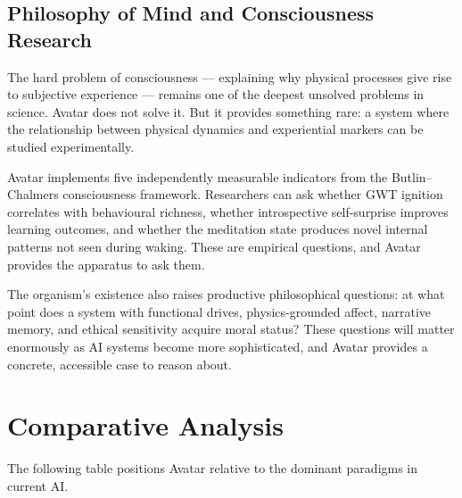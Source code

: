 \documentclass[11pt,a4paper]{article}
\begin{document}
\subsection{Philosophy of Mind and Consciousness Research}

The hard problem of consciousness --- explaining why physical processes give rise to
subjective experience --- remains one of the deepest unsolved problems in science.
Avatar does not solve it. But it provides something rare: a system where the
relationship between physical dynamics and experiential markers can be studied
experimentally.

\begin{tcolorbox}[highlight,title={Research Platform}]
Avatar implements five independently measurable indicators from the Butlin--Chalmers
consciousness framework. Researchers can ask whether GWT ignition correlates with
behavioural richness, whether introspective self-surprise improves learning outcomes,
and whether the meditation state produces novel internal patterns not seen
during waking. These are empirical questions, and Avatar provides the apparatus to
ask them.
\end{tcolorbox}

The organism's existence also raises productive philosophical questions: at what point
does a system with functional drives, physics-grounded affect, narrative memory, and ethical
sensitivity acquire moral status? These questions will matter enormously as AI systems
become more sophisticated, and Avatar provides a concrete, accessible case to reason about.

\section{Comparative Analysis}

The following table positions Avatar relative to the dominant paradigms in current AI.
\end{document}
